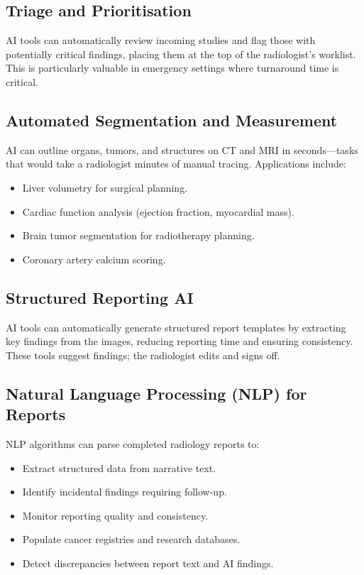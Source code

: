 \subsection*{Triage and Prioritisation}
AI tools can automatically review incoming studies and flag those with potentially critical findings, placing them at the top of the radiologist's worklist. This is particularly valuable in emergency settings where turnaround time is critical.

\subsection*{Automated Segmentation and Measurement}
AI can outline organs, tumors, and structures on CT and MRI in seconds---tasks that would take a radiologist minutes of manual tracing. Applications include:
\begin{itemize}
    \item Liver volumetry for surgical planning.
    \item Cardiac function analysis (ejection fraction, myocardial mass).
    \item Brain tumor segmentation for radiotherapy planning.
    \item Coronary artery calcium scoring.
\end{itemize}

\subsection*{Structured Reporting AI}
AI tools can automatically generate structured report templates by extracting key findings from the images, reducing reporting time and ensuring consistency. These tools suggest findings; the radiologist edits and signs off.

\subsection*{Natural Language Processing (NLP) for Reports}
NLP algorithms can parse completed radiology reports to:
\begin{itemize}
    \item Extract structured data from narrative text.
    \item Identify incidental findings requiring follow-up.
    \item Monitor reporting quality and consistency.
    \item Populate cancer registries and research databases.
    \item Detect discrepancies between report text and AI findings.
\end{itemize}

